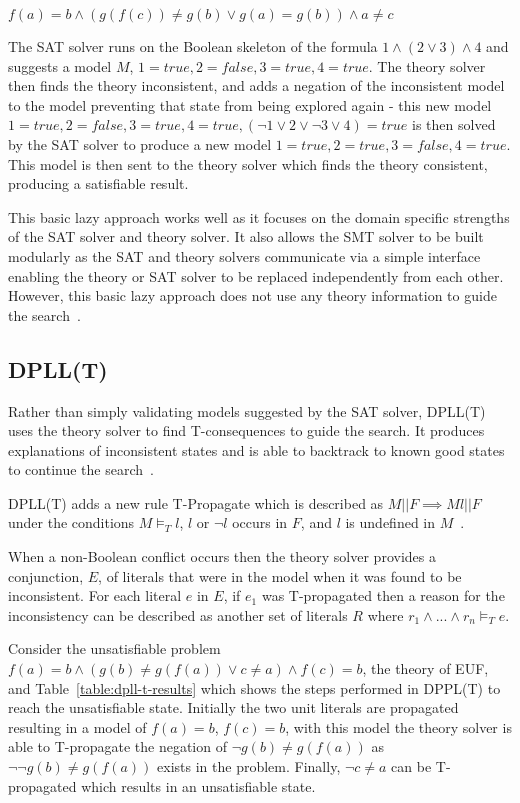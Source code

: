 \documentclass[]{final_report}
\begin{document}
$ f(a) = b \land (g(f(c)) \neq g(b) \lor g(a) = g(b)) \land a \neq c $

The SAT solver runs on the Boolean skeleton of the formula $1 \land (2 \lor 3) \land 4$ and suggests a model $M$, $1 = \mathit{true}, 2 = \mathit{false}, 3 = \mathit{true}, 4 = \mathit{true}$. The theory solver then finds the theory inconsistent, and adds a negation of the inconsistent model to the model preventing that state from being explored again - this new model $ 1 = \mathit{true}, 2 = \mathit{false}, 3 = \mathit{true}, 4 = \mathit{true}, (\lnot 1 \lor 2 \lor \lnot 3 \lor 4 ) = true $ is then solved by the SAT solver to produce a new model $ 1 = \mathit{true}, 2 = \mathit{true}, 3 = \mathit{false}, 4 = \mathit{true}$. This model is then sent to the theory solver which finds the theory consistent, producing a satisfiable result.

This basic lazy approach works well as it focuses on the domain specific strengths of the SAT solver and theory solver. It also allows the SMT solver to be built modularly as the SAT and theory solvers communicate via a simple interface enabling the theory or SAT solver to be replaced independently from each other. However, this basic lazy approach does not use any theory information to guide the search~\cite{sattosmt}.

\subsection{DPLL(T)}
Rather than simply validating models suggested by the SAT solver, DPLL(T) uses the theory solver to find T-consequences to guide the search. It produces explanations of inconsistent states and is able to backtrack to known good states to continue the search~\cite{smtdpplt, ganzinger2004dpll}.

DPLL(T) adds a new rule T-Propagate which is described as $M || F \implies M l || F $ under the conditions $M \models _T l$, $l$ or $\lnot l$ occurs in $F$, and $l$ is undefined in $M$~\cite{sattosmt}.

When a non-Boolean conflict occurs then the theory solver provides a conjunction, $E$, of literals that were in the model when it was found to be inconsistent. For each literal $e $ in $E$, if $e_1$ was T-propagated then a reason for the inconsistency can be described as another set of literals $R$ where $r_1 \land ... \land r_n \models _T e$. 

Consider the unsatisfiable problem $f(a) = b \land (g(b) \neq g(f(a)) \lor c \neq a) \land f(c) = b$,  the theory of EUF, and Table~\ref{table:dpll-t-results} which shows the steps performed in DPPL(T) to reach the unsatisfiable state. Initially the two unit literals are propagated resulting in a model of $f(a) = b$, $f(c) = b$, with this model the theory solver is able to T-propagate the negation of $\lnot{g(b) \neq g(f(a))}$ as $\lnot{\lnot{g(b) \neq g(f(a))}}$ exists in the problem. Finally, $\lnot{c \neq a}$ can be T-propagated which results in an unsatisfiable state.
\end{document}
